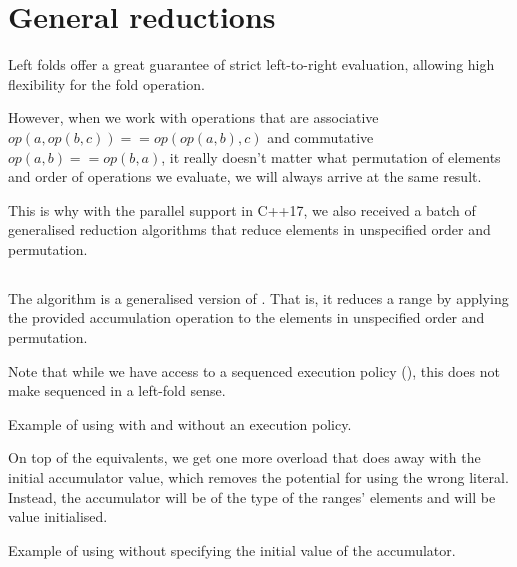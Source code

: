 \section{General reductions}

Left folds offer a great guarantee of strict left-to-right evaluation, allowing high flexibility for the fold operation.

However, when we work with operations that are associative $op(a, op(b,c)) == op(op(a,b),c)$ and commutative $op(a,b) == op(b,a)$, it really doesn’t matter what permutation of elements and order of operations we evaluate, we will always arrive at the same result.

This is why with the parallel support in C++17, we also received a batch of generalised reduction algorithms that reduce elements in unspecified order and permutation.

\subsection{\texorpdfstring{}{\texttt{std::reduce}}}

The  algorithm is a generalised version of . That is, it reduces a range by applying the provided accumulation operation to the elements in unspecified order and permutation.


Note that while we have access to a sequenced execution policy (), this does not make  sequenced in a left-fold sense.

\begin{box-note}
\footnotesize Example of using  with and without an execution policy.
\tcblower
{}
\end{box-note}

On top of the  equivalents, we get one more overload that does away with the initial accumulator value, which removes the potential for using the wrong literal. Instead, the accumulator will be of the type of the ranges’ elements and will be value initialised.

\begin{box-note}
\footnotesize Example of using  without specifying the initial value of the accumulator.
\tcblower
{}
\end{box-note}

